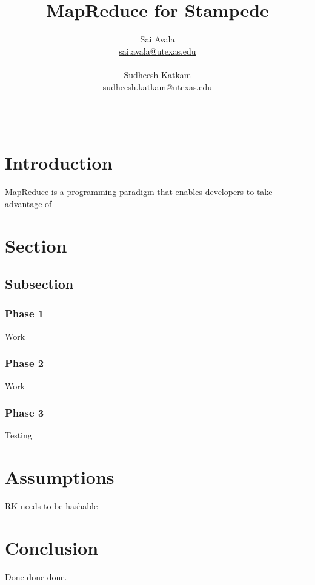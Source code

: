 \documentclass[11pt]{article}
\title{MapReduce for Stampede}
\author{
  Sai Avala\\ 
  \href{mailto:sai.avala@utexas.edu}
          {sai.avala@utexas.edu}  \\ \\
  Sudheesh Katkam \\
  \href{mailto:sudheesh.katkam@utexas.edu}
          {sudheesh.katkam@utexas.edu}  }
\begin{document}
\maketitle
\newpage
\rule{6.0in}{.015in}
\tableofcontents
\newpage

\section{Introduction}
MapReduce is a programming paradigm that enables developers to take advantage of 


\section{Section}
\subsection{Subsection}
\subsubsection*{Phase 1}
Work 
\subsubsection*{Phase 2}
Work
\subsubsection*{Phase 3}
Testing

\section{Assumptions}
RK needs to be hashable

\section{Conclusion}
Done done done.
\end{document}
